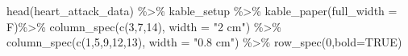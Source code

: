 \documentclass[
]{article}
\newenvironment{Shaded}{\begin{snugshade}}{\end{snugshade}}
\newcommand{\AttributeTok}[1]{\textcolor[rgb]{0.77,0.63,0.00}{#1}}
\newcommand{\ConstantTok}[1]{\textcolor[rgb]{0.00,0.00,0.00}{#1}}
\newcommand{\DecValTok}[1]{\textcolor[rgb]{0.00,0.00,0.81}{#1}}
\newcommand{\FunctionTok}[1]{\textcolor[rgb]{0.00,0.00,0.00}{#1}}
\newcommand{\NormalTok}[1]{#1}
\newcommand{\SpecialCharTok}[1]{\textcolor[rgb]{0.00,0.00,0.00}{#1}}
\newcommand{\StringTok}[1]{\textcolor[rgb]{0.31,0.60,0.02}{#1}}
\begin{document}
\begin{Shaded}
\begin{Highlighting}[]
\FunctionTok{head}\NormalTok{(heart\_attack\_data) }\SpecialCharTok{\%\textgreater{}\%} 
\NormalTok{  kable\_setup }\SpecialCharTok{\%\textgreater{}\%} 
  \FunctionTok{kable\_paper}\NormalTok{(}\AttributeTok{full\_width =}\NormalTok{ F)}\SpecialCharTok{\%\textgreater{}\%} 
  \FunctionTok{column\_spec}\NormalTok{(}\FunctionTok{c}\NormalTok{(}\DecValTok{3}\NormalTok{,}\DecValTok{7}\NormalTok{,}\DecValTok{14}\NormalTok{), }\AttributeTok{width =} \StringTok{"2 cm"}\NormalTok{) }\SpecialCharTok{\%\textgreater{}\%}
  \FunctionTok{column\_spec}\NormalTok{(}\FunctionTok{c}\NormalTok{(}\DecValTok{1}\NormalTok{,}\DecValTok{5}\NormalTok{,}\DecValTok{9}\NormalTok{,}\DecValTok{12}\NormalTok{,}\DecValTok{13}\NormalTok{), }\AttributeTok{width =} \StringTok{"0.8 cm"}\NormalTok{) }\SpecialCharTok{\%\textgreater{}\%}
  \FunctionTok{row\_spec}\NormalTok{(}\DecValTok{0}\NormalTok{,}\AttributeTok{bold=}\ConstantTok{TRUE}\NormalTok{)}
\end{Highlighting}
\end{Shaded}
\end{document}
